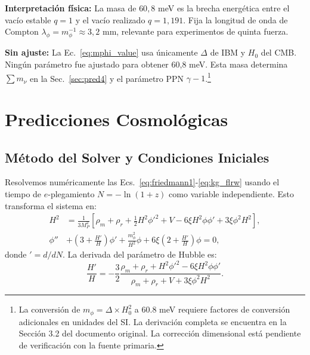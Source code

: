 \documentclass[12pt, a4paper]{article}
\theoremstyle{miuThm}
\theoremstyle{remark}
\begin{document}
\textbf{Interpretación física:} La masa de $60{,}8$ meV es la brecha energética
entre el vacío estable $q = 1$ y el vacío realizado $q = 1{,}191$. Fija la longitud
de onda de Compton $\lambda_\phi = m_\phi^{-1} \approx 3{,}2$ mm, relevante para
experimentos de quinta fuerza.

\textbf{Sin ajuste:} La Ec.~\eqref{eq:mphi_value} usa únicamente $\Delta$ de IBM
y $H_0$ del CMB. Ningún parámetro fue ajustado para obtener 60{,}8 meV. Esta masa
determina $\sum m_\nu$ en la Sec.~\ref{sec:pred4} y el parámetro PPN $\gamma-1$.\footnote{La conversión de $m_\phi = \Delta \times H_0^2$ a 60.8 meV requiere factores de conversión adicionales en unidades del SI. La derivación completa se encuentra en la Sección 3.2 del documento original. La corrección dimensional está pendiente de verificación con la fuente primaria.}

\section{Predicciones Cosmológicas}
\label{sec:predictions}

\subsection{Método del Solver y Condiciones Iniciales}
\label{subsec:solver}

Resolvemos numéricamente las Ecs.~\eqref{eq:friedmann1}-\eqref{eq:kg_flrw}
usando el tiempo de $e$-plegamiento $N = -\ln(1+z)$ como variable independiente.
Esto transforma el sistema en:
\begin{align}
H^2 &= \frac{1}{3M_P^2}\left[ \rho_m + \rho_r + \frac{1}{2}H^2\phi'^2
      + V - 6\xi H^2\phi\phi' + 3\xi\phi^2 H^2 \right], \label{eq:H_N} \\
\phi'' &+ \left(3 + \frac{H'}{H}\right)\phi' + \frac{m_\phi^2}{H^2}\phi
        + 6\xi\left(2 + \frac{H'}{H}\right)\phi = 0, \label{eq:phi_N}
\end{align}
donde $' = d/dN$. La derivada del parámetro de Hubble es:
\begin{equation}
\frac{H'}{H} = -\frac{3}{2}\frac{\rho_m + \rho_r + H^2\phi'^2 - 6\xi H^2\phi\phi'}
                    {\rho_m + \rho_r + V + 3\xi\phi^2 H^2}.
\label{eq:Hprime}
\end{equation}
\end{document}
